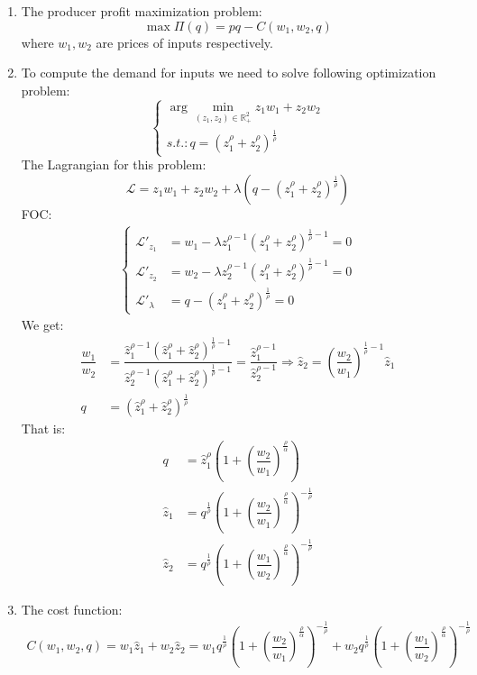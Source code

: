 \documentclass[a4paper,12pt]{article} %
\begin{document}
\begin{enumerate}
	\item The producer profit maximization problem: 
				\begin{equation}
	\max{\Pi(q) = pq - C(w_1, w_2, q)} 
	\end{equation}
	where $ w_1, w_2 $ are prices of inputs respectively.
	\item 	To compute the demand for inputs we need to solve following optimization problem: 
	\begin{equation}
	\begin{cases}
	\arg \min_{(z_1,z_2) \in \mathbb{R}^2_+  }{z_1 w_1 + z_2 w_2} \\ 
	s.t.: q =  (z_1^\rho + z_2^\rho)^{\frac{1}{\rho}}
	\end{cases} 
	\end{equation}
	The  Lagrangian for this problem: 
	\[  \mathcal{L} =   z_1 w_1 + z_2 w_2 + \lambda  ( q - (z_1^\rho +  z_2^\rho)^{\frac{1}{\rho}} ) \]
	FOC: 
	\begin{align*}
	\begin{cases}
	\mathcal{L}'_{z_1 } & =  w_1  -  \lambda z_1^{\rho-1} (z_1^\rho+z_2^\rho)^{\frac{1}{\rho} - 1 }  = 0    \\
	\mathcal{L}'_{z_2 } & =  w_2  -  \lambda z_2^{\rho-1} (z_1^\rho+z_2^\rho)^{\frac{1}{\rho} - 1 }  = 0  \\
	\mathcal{L}'_{\lambda} & = q - (z_1^\rho + z_2^\rho)^{\frac{1}{\rho}} = 0 
	\end{cases}
	\end{align*}
	We get: 
	\begin{align*}
	\dfrac{w_1 }{w_2} & =  \dfrac{ \hat{z}_1^{\rho-1} (\hat{z}_1^\rho+\hat{z}_2^\rho)^{\frac{1}{\rho} - 1 } }{\hat{z}_2^{\rho-1} (\hat{z}_1^\rho+\hat{z}_2^\rho)^{\frac{1}{\rho} - 1 } } = \dfrac{ \hat{z}_1^{\rho-1}  }{\hat{z}_2^{\rho-1}  } \Rightarrow \hat{z}_2 = \left( \dfrac{w_2} { w_1} \right) ^{\frac{1}{\rho}-1} \hat{z}_1  \\
	q & = (\hat{z}_1^\rho + \hat{z}_2^\rho)^{\frac{1}{\rho}}   
	\end{align*}
	That is: 
	\begin{align*}
	q  &= \hat{z}_1^{\rho}  \left( 1 + \left( \dfrac{w_2}{w_1}   \right) ^{\frac{\rho}{\alpha}} \right) \\ 
	\hat{z}_1 &=  q^{\frac{1}{\rho}}  \left( 1 + \left( \dfrac{w_2}{w_1}   \right) ^{\frac{\rho}{\alpha}} \right)^{-\frac{1}{\rho}} \\   
	\hat{z}_2 &=  q^{\frac{1}{\rho}}  \left( 1 + \left( \dfrac{w_1}{w_2}   \right) ^{\frac{\rho}{\alpha}} \right)^{-\frac{1}{\rho}}
			\end{align*}
	\item The cost
	function:
	\begin{multline*}
	C(w_1, w_2, q) = w_1 \hat{z}_1  +  w_2 \hat{z}_2 =   
	w_1 
	q^{\frac{1}{\rho}}  \left( 1 +  \left( \dfrac{w_2}{w_1}   \right) ^{\frac{\rho}{\alpha}} \right)^{-\frac{1}{\rho}}  + w_2 q^{\frac{1}{\rho}}  \left( 1 + \left( \dfrac{w_1}{w_2}   \right) ^{\frac{\rho}{\alpha}} \right)^{-\frac{1}{\rho}}  
	\end{multline*} 
	\end{enumerate}
\end{document}
